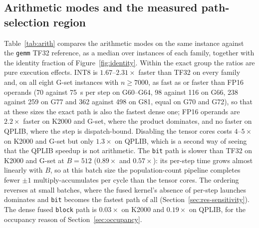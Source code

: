 \documentclass[11pt,a4paper]{article}
\newcommand{\code}[1]{\texttt{#1}}
\begin{document}
\subsection{Arithmetic modes and the measured path-selection region}\label{sec:res-region}
Table~\ref{tab:arith} compares the arithmetic modes on the same instance against the \code{gemm} TF32 reference, as a median over instances of each family, together with the identity fraction of Figure~\ref{fig:identity}. Within the exact group the ratios are pure execution effects. INT8 is $1.67$--$2.31\times$ faster than TF32 on every family and, on all eight G-set instances with $n\ge7000$, as fast as or faster than FP16 operands (70 against 75~\textmu s per step on G60--G64, 98 against 116 on G66, 238 against 259 on G77 and 362 against 498 on G81, equal on G70 and G72), so that at these sizes the exact path is also the fastest dense one; FP16 operands are $2.2\times$ faster on K2000 and G-set, where the product dominates, and no faster on QPLIB, where the step is dispatch-bound. Disabling the tensor cores costs $4$--$5\times$ on K2000 and G-set but only $1.3\times$ on QPLIB, which is a second way of seeing that the QPLIB speedup is not arithmetic. The \code{bit} path is slower than TF32 on K2000 and G-set at $B=512$ ($0.89\times$ and $0.57\times$): its per-step time grows almost linearly with $B$, so at this batch size the population-count pipeline completes fewer $\pm1$ multiply-accumulates per cycle than the tensor cores. The ordering reverses at small batches, where the fused kernel's absence of per-step launches dominates and \code{bit} becomes the fastest path of all (Section~\ref{sec:res-sensitivity}). The dense fused \code{block} path is $0.03\times$ on K2000 and $0.19\times$ on QPLIB, for the occupancy reason of Section~\ref{sec:occupancy}.

\begin{table}[!ht]\centering\small
\caption{Arithmetic-mode comparison at $K=3200$. Ratio $=t(\text{\code{gemm} TF32})/t(\text{path})$ on the same instance, median over the instances of each family (number of instances in parentheses); ``identical'' is the mean over instances of the fraction of seeds whose final cut equals the TF32 reference.}
\label{tab:arith}

\end{table}
\end{document}
